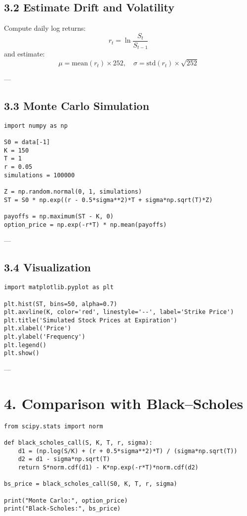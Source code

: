 \documentclass[12pt]{article}
\begin{document}
\subsection{3.2 Estimate Drift and Volatility}
Compute daily log returns:
\[
r_t = \ln \frac{S_t}{S_{t-1}}
\]
and estimate:
\[
\mu = \text{mean}(r_t) \times 252, \quad
\sigma = \text{std}(r_t) \times \sqrt{252}
\]

---

\subsection{3.3 Monte Carlo Simulation}
\begin{verbatim}
import numpy as np

S0 = data[-1]
K = 150
T = 1
r = 0.05
simulations = 100000

Z = np.random.normal(0, 1, simulations)
ST = S0 * np.exp((r - 0.5*sigma**2)*T + sigma*np.sqrt(T)*Z)

payoffs = np.maximum(ST - K, 0)
option_price = np.exp(-r*T) * np.mean(payoffs)
\end{verbatim}

---

\subsection{3.4 Visualization}
\begin{verbatim}
import matplotlib.pyplot as plt

plt.hist(ST, bins=50, alpha=0.7)
plt.axvline(K, color='red', linestyle='--', label='Strike Price')
plt.title('Simulated Stock Prices at Expiration')
plt.xlabel('Price')
plt.ylabel('Frequency')
plt.legend()
plt.show()
\end{verbatim}

---

\section{4. Comparison with Black--Scholes}
\begin{verbatim}
from scipy.stats import norm

def black_scholes_call(S, K, T, r, sigma):
    d1 = (np.log(S/K) + (r + 0.5*sigma**2)*T) / (sigma*np.sqrt(T))
    d2 = d1 - sigma*np.sqrt(T)
    return S*norm.cdf(d1) - K*np.exp(-r*T)*norm.cdf(d2)

bs_price = black_scholes_call(S0, K, T, r, sigma)

print("Monte Carlo:", option_price)
print("Black-Scholes:", bs_price)
\end{verbatim}
\end{document}
